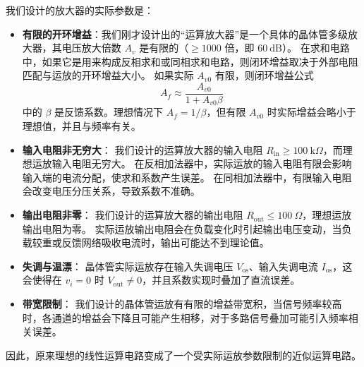 \documentclass{article}
\begin{document}
我们设计的放大器的实际参数是：
\begin{itemize}
    \item \textbf{有限的开环增益}：我们刚才设计出的“运算放大器”是一个具体的晶体管多级放大器，其电压放大倍数 \(A_v\) 是有限的（\(\geq 1000\) 倍，即 \(60\ \text{dB}\)）。  
    在求和电路中，如果它是用来构成反相求和或同相求和电路，则闭环增益取决于外部电阻匹配与运放的开环增益大小。  
    如果实际 \(A_{v0}\) 有限，则闭环增益公式  
    \[
    A_{f} \approx \frac{A_{v0}}{1 + A_{v0} \beta}
    \]  
    中的 \(\beta\) 是反馈系数。理想情况下 \(A_f = 1/\beta\)，但有限 \(A_{v0}\) 时实际增益会略小于理想值，并且与频率有关。

    \item \textbf{输入电阻非无穷大}：  
    我们设计的运算放大器的输入电阻 \(R_{\text{in}} \geq 100\ \text{k}\Omega\)，而理想运放输入电阻无穷大。  
    在反相加法器中，实际运放的输入电阻有限会影响输入端的电流分配，使求和系数产生误差。  
    在同相加法器中，有限输入电阻会改变电压分压关系，导致系数不准确。

    \item \textbf{输出电阻非零}：  
    我们设计的运算放大器的输出电阻 \(R_{\text{out}} \leq 100\ \Omega\)，理想运放输出电阻为零。  
    实际运放输出电阻会在负载变化时引起输出电压变动，当负载较重或反馈网络吸收电流时，输出可能达不到理论值。

    \item \textbf{失调与温漂}：  
    晶体管实际运放存在输入失调电压 \(V_{\text{os}}\)、输入失调电流 \(I_{\text{os}}\)，这会使得在 \(v_i = 0\) 时 \(V_{\text{out}} \neq 0\)，并且系数实现时叠加了直流误差。

    \item \textbf{带宽限制}：  
    我们设计的晶体管运放有有限的增益带宽积，当信号频率较高时，各通道的增益会下降且可能产生相移，对于多路信号叠加可能引入频率相关误差。
\end{itemize}

因此，原来理想的线性运算电路变成了一个受实际运放参数限制的近似运算电路。
\end{document}
